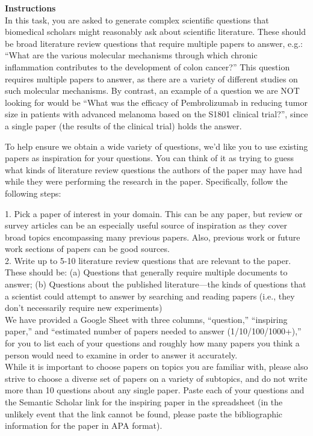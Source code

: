 \documentclass{article} %
\begin{document}
\begin{table}[h!]
\begin{tcolorbox}
{\bf Instructions}\\ 

In this task, you are asked to generate complex scientific questions that biomedical scholars might reasonably ask about scientific literature.  These should be broad literature review questions that require multiple papers to answer, e.g.: ``What are the various molecular mechanisms through which chronic inflammation contributes to the development of colon cancer?''  This question requires multiple papers to answer, as there are a variety of different studies on such molecular mechanisms.  By contrast, an example of a question we are NOT looking for would be ``What was the efficacy of Pembrolizumab in reducing tumor size in patients with advanced melanoma based on the S1801 clinical trial?'', since a single paper (the results of the clinical trial) holds the answer.


To help ensure we obtain a wide variety of questions, we'd like you to use existing papers as inspiration for your questions.  You can think of it as trying to guess what kinds of literature review questions the authors of the paper may have had while they were performing the research in the paper.  Specifically, follow the following steps:


1. Pick a paper of interest in your domain.  This can be any paper, but review or survey articles can be an especially useful source of inspiration as they cover broad topics encompassing many previous papers.  Also, previous work or future work sections of papers can be good sources. \\
2. Write up to 5-10 literature review questions that are relevant to the paper.  These should be:
(a) Questions that generally require multiple documents to answer; (b) Questions about the published literature—the kinds of questions that a scientist could attempt to answer by searching and reading papers (i.e., they don’t necessarily require new experiments)
\\
We have provided a Google Sheet with three columns, ``question,'' ``inspiring paper,'' and ``estimated number of papers needed to answer (1/10/100/1000+),'' for you to list each of your questions and roughly how many papers you think a person would need to examine in order to answer it accurately.
\\

While it is important to choose papers on topics you are familiar with, please also strive to choose a diverse set of papers on a variety of subtopics, and do not write more than 10 questions about any single paper.  Paste each of your questions and the Semantic Scholar link for the inspiring paper in the spreadsheet (in the unlikely event that the link cannot be found, please paste the bibliographic information for the paper in APA format).


\end{tcolorbox}
\end{table}
\end{document}
